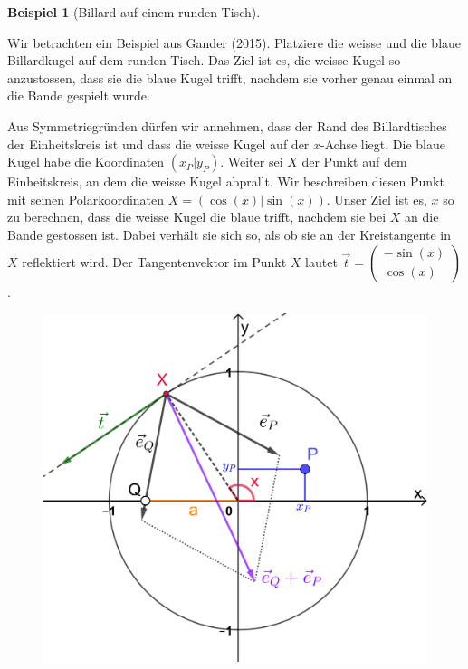 \documentclass[
  a4paper,
  DIV=11]{scrreprt}
\theoremstyle{definition}
\theoremstyle{definition}
\newtheorem{example}{Beispiel}[chapter]
\theoremstyle{remark}
\begin{document}
\begin{example}[Billard auf einem runden
Tisch]\protect\hypertarget{exm-Billard}{}\label{exm-Billard}

Wir betrachten ein Beispiel aus Gander (2015). Platziere die weisse und
die blaue Billardkugel auf dem runden Tisch. Das Ziel ist es, die weisse
Kugel so anzustossen, dass sie die blaue Kugel trifft, nachdem sie
vorher genau einmal an die Bande gespielt wurde.

Aus Symmetriegründen dürfen wir annehmen, dass der Rand des
Billardtisches der Einheitskreis ist und dass die weisse Kugel auf der
\(x\)-Achse liegt. Die blaue Kugel habe die Koordinaten \((x_P|y_P)\).
Weiter sei \(X\) der Punkt auf dem Einheitskreis, an dem die weisse
Kugel abprallt. Wir beschreiben diesen Punkt mit seinen Polarkoordinaten
\(X=(\cos(x)|\sin(x))\). Unser Ziel ist es, \(x\) so zu berechnen, dass
die weisse Kugel die blaue trifft, nachdem sie bei \(X\) an die Bande
gestossen ist. Dabei verhält sie sich so, als ob sie an der
Kreistangente in \(X\) reflektiert wird. Der Tangentenvektor im Punkt
\(X\) lautet
\(\vec{t} = \begin{pmatrix} -\sin(x) \\ \cos(x) \end{pmatrix}\).

\begin{figure}[H]

{\centering \includegraphics{CircularBillard_sketch.png}

}
\end{figure}
\end{example}
\end{document}
